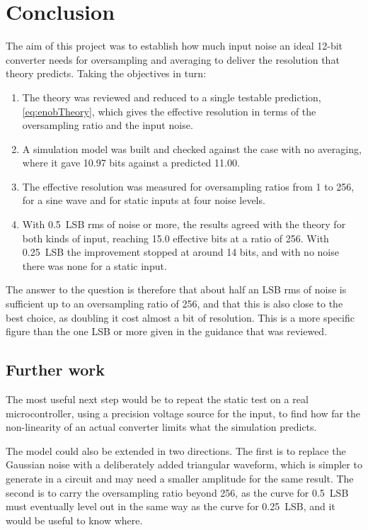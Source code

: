 
\section{Conclusion}
\label{sec:conclusion}

The aim of this project was to establish how much input noise an ideal 12-bit
converter needs for oversampling and averaging to deliver the resolution that
theory predicts. Taking the objectives in turn:

\begin{enumerate}
  \item The theory was reviewed and reduced to a single testable prediction,
        \cref{eq:enobTheory}, which gives the effective resolution in terms
        of the oversampling ratio and the input noise.
  \item A simulation model was built and checked against the case with no
        averaging, where it gave 10.97 bits against a predicted 11.00.
  \item The effective resolution was measured for oversampling ratios from 1
        to 256, for a sine wave and for static inputs at four noise levels.
  \item With \qty{0.5}{LSB} rms of noise or more, the results agreed with the
        theory for both kinds of input, reaching 15.0 effective bits at a
        ratio of 256. With \qty{0.25}{LSB} the improvement stopped at around
        14 bits, and with no noise there was none for a static input.
\end{enumerate}

The answer to the question is therefore that about half an LSB rms of noise
is sufficient up to an oversampling ratio of 256, and that this is also close
to the best choice, as doubling it cost almost a bit of resolution. This is a
more specific figure than the one LSB or more given in the guidance that was
reviewed.

\subsection{Further work}

The most useful next step would be to repeat the static test on a real
microcontroller, using a precision voltage source for the input, to find how
far the non-linearity of an actual converter limits what the simulation
predicts.

The model could also be extended in two directions. The first is to replace
the Gaussian noise with a deliberately added triangular waveform, which is
simpler to generate in a circuit and may need a smaller amplitude for the
same result. The second is to carry the oversampling ratio beyond 256, as the
curve for \qty{0.5}{LSB} must eventually level out in the same way as the
curve for \qty{0.25}{LSB}, and it would be useful to know where.

